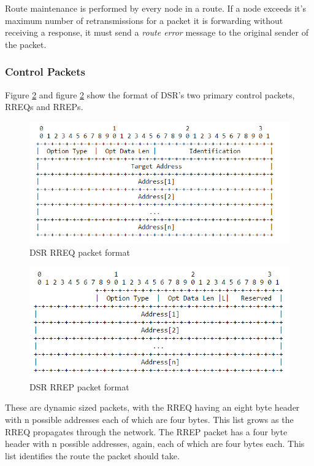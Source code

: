     Route maintenance is performed by every node in a route. If a node exceeds
    it's maximum number of retransmissions for a packet it is forwarding without
    receiving a response, it must send a \textit{route error} message to the original
    sender of the packet.

      \subsubsection{Control Packets}
    Figure \ref{fig:dsr_rreq} and figure \ref{fig:dsr_rreq} show the format
    of DSR's two primary control packets, RREQs and RREPs.

    \FloatBarrier
    \begin{figure}[ht]
      \includegraphics[scale=0.75]{Images/chapter2/dsr_rreq.png}
      \caption{DSR RREQ packet format}
      \label{fig:dsr_rreq}
    \end{figure}
    \FloatBarrier

    \FloatBarrier
    \begin{figure}[ht]
      \includegraphics[scale=0.75]{Images/chapter2/dsr_rrep.png}
      \caption{DSR RREP packet format}
      \label{fig:dsr_rreq}
    \end{figure}
    \FloatBarrier

    These are dynamic sized packets, with the RREQ having an eight byte header
    with n possible addresses each of which are four bytes. This list grows as the
    RREQ propagates through the network. The RREP packet has a four byte header
    with n possible addresses, again, each of which are four bytes each. This list
    identifies the route the packet should take.

